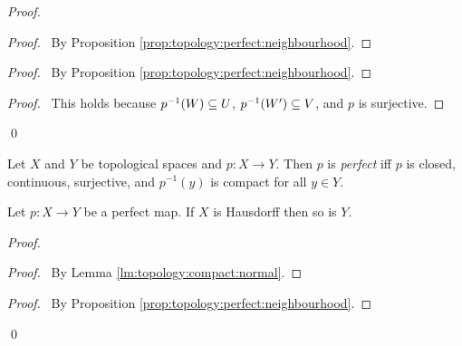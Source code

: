 \begin{proof}
 \pf
 \begin{proof}
   \pf\ By Proposition \ref{prop:topology:perfect:neighbourhood}.
 \end{proof}
 \begin{proof}
   \pf\ By Proposition \ref{prop:topology:perfect:neighbourhood}.
 \end{proof}
 \begin{proof}
   \pf\ This holds because ${p}^{-1}(W) \subseteq U$, ${p}^{-1}(W') \subseteq
V$, and $p$ is surjective.
 \end{proof}
 \qed
\end{proof}

\begin{df}
  Let $X$ and $Y$ be topological spaces and $p : X \rightarrow Y$. Then $p$
  is
  \emph{perfect} iff $p$ is closed, continuous, surjective, and $p^{-1}(y)$
  is
  compact for all $y \in Y$.
\end{df}

  \begin{prop}
    \label{prop:topology:perfect:Hausdorff}
 Let $p : X \rightarrow Y$ be a perfect map. If $X$ is Hausdorff then so is
$Y$.
\end{prop}

\begin{proof}
 \pf
 \begin{proof}
   \pf\ By Lemma \ref{lm:topology:compact:normal}.
 \end{proof}
 \begin{proof}
   \pf\ By Proposition \ref{prop:topology:perfect:neighbourhood}.
 \end{proof}
 \qed
\end{proof}

